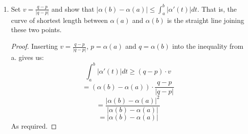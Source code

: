 \documentclass[a4paper,17pt]{extarticle}
\theoremstyle{definition}
\begin{document}
\begin{itemize}
\begin{enumerate}[label=\alph*.]
        \item Set $v=\frac{q-p}{|q-p|}$ and show that $|\alpha(b)-\alpha(a)|\leq\int_a^b|\alpha'(t)|dt$. That is, the curve of shortest length between $\alpha(a)$ and $\alpha(b)$ is the straight line joining these two points.\begin{proof}Inserting $v=\frac{q-p}{|q-p|}$, $p=\alpha(a)$ and $q=\alpha(b)$ into the inequality from a. gives us:$$\int_a^b|\alpha'(t)|dt\geq(q-p)\cdot v$$ $$=(\alpha(b)-\alpha(a))\cdot\frac{q-p}{|q-p|}$$ $$=\frac{|\alpha(b)-\alpha(a)|^2}{|\alpha(b)-\alpha(a)|}$$ $$=|\alpha(b)-\alpha(a)|$$ As required.\end{proof}
    \end{enumerate}
\end{itemize}
\end{document}
